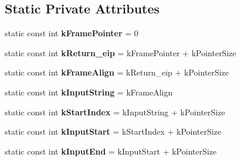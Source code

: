 \subsection*{Static Private Attributes}
\begin{DoxyCompactItemize}
\item 
static const int {\bfseries k\+Frame\+Pointer} = 0\hypertarget{classv8_1_1internal_1_1_reg_exp_macro_assembler_x87_a2472cca258e3fc21a66bf25f0cf5e29e}{}\label{classv8_1_1internal_1_1_reg_exp_macro_assembler_x87_a2472cca258e3fc21a66bf25f0cf5e29e}

\item 
static const int {\bfseries k\+Return\+\_\+eip} = k\+Frame\+Pointer + k\+Pointer\+Size\hypertarget{classv8_1_1internal_1_1_reg_exp_macro_assembler_x87_a365312e2a5749017ef0c8fa061817ffd}{}\label{classv8_1_1internal_1_1_reg_exp_macro_assembler_x87_a365312e2a5749017ef0c8fa061817ffd}

\item 
static const int {\bfseries k\+Frame\+Align} = k\+Return\+\_\+eip + k\+Pointer\+Size\hypertarget{classv8_1_1internal_1_1_reg_exp_macro_assembler_x87_aac3cc89420c647f33e5fabac2ca192d6}{}\label{classv8_1_1internal_1_1_reg_exp_macro_assembler_x87_aac3cc89420c647f33e5fabac2ca192d6}

\item 
static const int {\bfseries k\+Input\+String} = k\+Frame\+Align\hypertarget{classv8_1_1internal_1_1_reg_exp_macro_assembler_x87_a98e00753c71095a7404acd9c7c29c640}{}\label{classv8_1_1internal_1_1_reg_exp_macro_assembler_x87_a98e00753c71095a7404acd9c7c29c640}

\item 
static const int {\bfseries k\+Start\+Index} = k\+Input\+String + k\+Pointer\+Size\hypertarget{classv8_1_1internal_1_1_reg_exp_macro_assembler_x87_a7ae4773815c15e9557396edf03d827c0}{}\label{classv8_1_1internal_1_1_reg_exp_macro_assembler_x87_a7ae4773815c15e9557396edf03d827c0}

\item 
static const int {\bfseries k\+Input\+Start} = k\+Start\+Index + k\+Pointer\+Size\hypertarget{classv8_1_1internal_1_1_reg_exp_macro_assembler_x87_a198178d8f36c5c94fca2588ff932c2d5}{}\label{classv8_1_1internal_1_1_reg_exp_macro_assembler_x87_a198178d8f36c5c94fca2588ff932c2d5}

\item 
static const int {\bfseries k\+Input\+End} = k\+Input\+Start + k\+Pointer\+Size\hypertarget{classv8_1_1internal_1_1_reg_exp_macro_assembler_x87_a124594bd8e74ee0909c83fe339818331}{}\label{classv8_1_1internal_1_1_reg_exp_macro_assembler_x87_a124594bd8e74ee0909c83fe339818331}


\end{DoxyCompactItemize}
